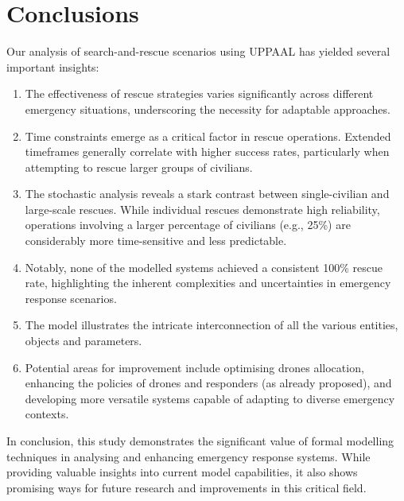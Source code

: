
\section{Conclusions}
Our analysis of search-and-rescue scenarios using UPPAAL has yielded several important insights:

\begin{enumerate}
	\item The effectiveness of rescue strategies varies significantly across different emergency situations, underscoring the necessity for adaptable approaches.
	
	\item Time constraints emerge as a critical factor in rescue operations. Extended timeframes generally correlate with higher success rates, particularly when attempting to rescue larger groups of civilians.
	
	\item The stochastic analysis reveals a stark contrast between single-civilian and large-scale rescues. While individual rescues demonstrate high reliability, operations involving a larger percentage of civilians (e.g., 25\%) are considerably more time-sensitive and less predictable.
	
	\item Notably, none of the modelled systems achieved a consistent 100\% rescue rate, highlighting the inherent complexities and uncertainties in emergency response scenarios.
	
	\item The model illustrates the intricate interconnection of all the various entities, objects and parameters.
	
	\item Potential areas for improvement include optimising drones allocation, enhancing the policies of drones and responders (as already proposed), and developing more versatile systems capable of adapting to diverse emergency contexts.
\end{enumerate}

In conclusion, this study demonstrates the significant value of formal modelling techniques in analysing and enhancing emergency response systems. While providing valuable insights into current model capabilities, it also shows promising ways for future research and improvements in this critical field.